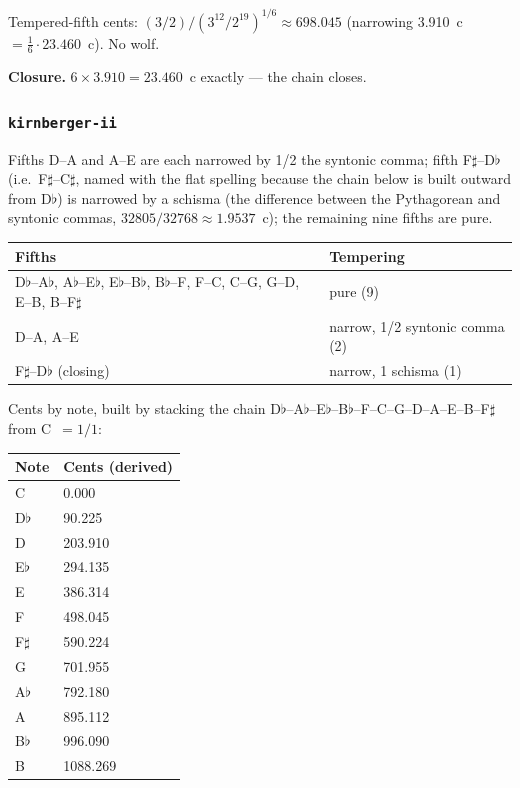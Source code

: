 \documentclass[11pt,letterpaper]{report}
\begin{document}
Tempered-fifth cents: $(3/2)/(3^{12}/2^{19})^{1/6} \approx 698.045$
(narrowing 3.910~c $= \tfrac{1}{6} \cdot 23.460$~c). No wolf.

\textbf{Closure.} $6 \times 3.910 = 23.460$~c exactly --- the chain
closes.

\subsubsection{\texttt{kirnberger-ii}}

Fifths D--A and A--E are each narrowed by 1/2 the syntonic comma;
fifth F$\sharp$--D$\flat$ (i.e.\ F$\sharp$--C$\sharp$, named with the
flat spelling because the chain below is built outward from
D$\flat$) is narrowed by a schisma (the difference between the
Pythagorean and syntonic commas, $32805/32768 \approx 1.9537$~c); the
remaining nine fifths are pure.

\begin{longtable}{p{9.5cm} p{2.5cm}}
  \toprule
  \textbf{Fifths} & \textbf{Tempering} \\
  \midrule
  \endhead
  D$\flat$--A$\flat$, A$\flat$--E$\flat$, E$\flat$--B$\flat$,
    B$\flat$--F, F--C, C--G, G--D, E--B, B--F$\sharp$ & pure (9) \\
  D--A, A--E & narrow, 1/2 syntonic comma (2) \\
  F$\sharp$--D$\flat$ (closing) & narrow, 1 schisma (1) \\
  \bottomrule
\end{longtable}

Cents by note, built by stacking the chain
D$\flat$--A$\flat$--E$\flat$--B$\flat$--F--C--G--D--A--E--B--F$\sharp$
from C~$= 1/1$:

\begin{longtable}{p{2.2cm} p{3.5cm}}
  \toprule
  \textbf{Note} & \textbf{Cents (derived)} \\
  \midrule
  \endhead
  C & 0.000 \\
  D$\flat$ & 90.225 \\
  D & 203.910 \\
  E$\flat$ & 294.135 \\
  E & 386.314 \\
  F & 498.045 \\
  F$\sharp$ & 590.224 \\
  G & 701.955 \\
  A$\flat$ & 792.180 \\
  A & 895.112 \\
  B$\flat$ & 996.090 \\
  B & 1088.269 \\
  \bottomrule
\end{longtable}
\end{document}
